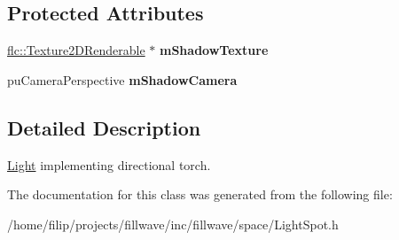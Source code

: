 \subsection*{Protected Attributes}
\begin{DoxyCompactItemize}
\item 
\mbox{\label{classflw_1_1flf_1_1LightSpot_ada8bc8c8e1b97ac39fadf5d818afbde1}} 
\hyperlink{classflw_1_1flc_1_1Texture2DRenderable}{flc\+::\+Texture2\+D\+Renderable} $\ast$ {\bfseries m\+Shadow\+Texture}
\item 
\mbox{\label{classflw_1_1flf_1_1LightSpot_aac27c310b7af304bc809a9e9c18a284f}} 
pu\+Camera\+Perspective {\bfseries m\+Shadow\+Camera}
\end{DoxyCompactItemize}


\subsection{Detailed Description}
\hyperlink{classflw_1_1flf_1_1Light}{Light} implementing directional torch. 

The documentation for this class was generated from the following file\+:\begin{DoxyCompactItemize}
\item 
/home/filip/projects/fillwave/inc/fillwave/space/Light\+Spot.\+h\end{DoxyCompactItemize}
